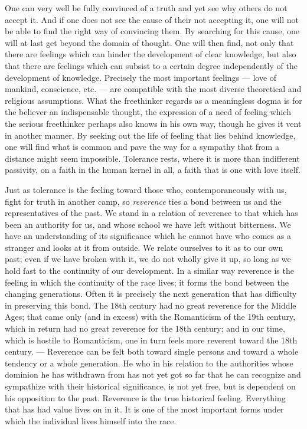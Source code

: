 \documentclass[12pt,a4paper,openany]{book}
\newcommand{\opage}[1]{\marginnote{\footnotesize\textit{[#1]}}}
\begin{document}
\opage{259}One can very well be fully convinced of a truth and yet see why others do not accept it. And if one does
not see the cause of their not accepting it, one will not be able to find the right way of convincing them. By
searching for this cause, one will at last get beyond the domain of thought. One will then find, not only that there
are feelings which can hinder the development of clear knowledge, but also that there are feelings which can subsist to
a certain degree independently of the development of knowledge. Precisely the most important feelings --- love of
mankind, conscience, etc. --- are compatible with the most diverse theoretical and religious assumptions. What the
freethinker regards as a meaningless dogma is for the believer an indispensable thought, the expression of a need of
feeling which the serious freethinker perhaps also knows in his own way, though he gives it vent in another manner. By
seeking out the life of feeling that lies behind knowledge, one will find what is common and pave the way for a
sympathy that from a distance might seem impossible. Tolerance rests, where it is more than indifferent passivity, on a
faith in the human kernel in all, a faith that is one with love itself.

Just as tolerance is the feeling toward those who, contemporaneously with us, fight for truth in another camp, so
\textit{reverence} ties a bond between us and the representatives of the past.
\opage{260}We stand in a relation of reverence to that which has been an authority for us, and whose school we have
left without bitterness. We have an understanding of its significance which he cannot have who comes as a stranger and
looks at it from outside. We relate ourselves to it as to our own past; even if we have broken with it, we do not
wholly give it up, so long as we hold fast to the continuity of our development. In a similar way reverence is the
feeling in which the continuity of the race lives; it forms the bond between the changing generations. Often it is
precisely the next generation that has difficulty in preserving this bond. The 18th century had no great reverence for
the Middle Ages; that came only (and in excess) with the Romanticism of the 19th century, which in return had no great
reverence for the 18th century; and in our time, which is hostile to Romanticism, one in turn feels more reverent
toward the 18th century. --- Reverence can be felt both toward single persons and toward a whole tendency or a whole
generation. He who in his relation to the authorities whose dominion he has withdrawn from has not yet got so far that
he can recognize and sympathize with their historical significance, is not yet free, but is dependent on his opposition
to the past. Reverence is the true historical feeling. Everything that has had value lives on in it. It is one of the
most important forms under which the individual lives himself into the race.
\end{document}

